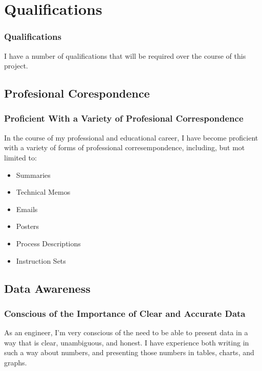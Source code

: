 \documentclass{beamer}
\begin{document}
\section{Qualifications}
\begin{frame}
  \frametitle{Qualifications}
  I have a number of qualifications that will be required over the course of
  this project.
\end{frame}

\subsection{Profesional Corespondence}
\begin{frame}
  \frametitle{Proficient With a Variety of Profesional Correspondence}
  In the course of my professional and educational career, I have become
  proficient with a variety of forms of professional corresempondence,
  including, but mot limited to:
  \begin{itemize}
    \item Summaries
    \item Technical Memos
    \item Emails
    \item Posters
    \item Process Descriptions
    \item Instruction Sets
  \end{itemize}
\end{frame}

\subsection{Data Awareness}
\begin{frame}
  \frametitle{Conscious of the Importance of Clear and Accurate Data}
  As an engineer, I'm very conscious of the need to be able to present data in
  a way that is clear, unambiguous, and honest.  I have experience both
  writing in such a way about numbers, and presenting those numbers in tables,
  charts, and graphs.
\end{frame}
\end{document}

